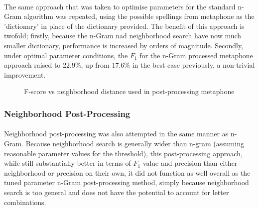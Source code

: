\documentclass[twocolumn]{article}
\begin{document}
\paragraph{}
    The same approach that was taken to optimise parameters for the standard n-Gram algorithm was repeated, using the
    possible spellings from metaphone as the 'dictionary' in place of the dictionary provided.
    The benefit of this approach is twofold;
    firstly, because the n-Gram nad neighborhood search have now much smaller dictionary, performance is increased by orders
    of magnitude.
    Secondly, under optimal parameter conditions, the $F_1$ for the n-Gram processed metaphone approach raised to 22.9\%,
    up from 17.6\% in the best case previously, a non-trivial improvement.




\begin{figure}[t]

    \caption{F-score vs neighborhood distance used in post-processing metaphone}
\end{figure}

            \subsubsection{Neighborhood Post-Processing}
\paragraph{}
    Neighborhood post-processing was also attempted in the same manner as n-Gram.
    Because neighborhood search is generally wider than n-gram (assuming reasonable parameter values for the
    threshold), this post-processing approach, while still substantially better in terms of $F_1$ value and precision than
    either neighborhood or precision on their own, it did not function as well overall as the tuned parameter n-Gram
    post-processing method, simply because neighborhood search is too general and does not have the potential to account
    for letter combinations.
\end{document}
